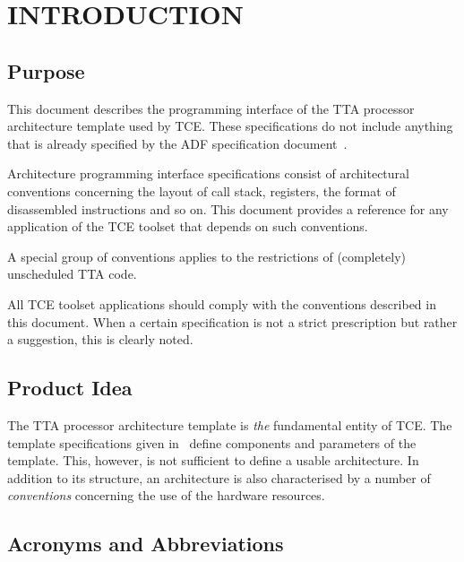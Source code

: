\documentclass[twoside]{tce}
\begin{document}
\tableofcontents

\chapter{INTRODUCTION}

\section{Purpose}

This document describes the programming interface of the TTA processor
architecture template used by TCE.  These specifications do not include
anything that is already specified by the ADF specification
document~\cite{ADF-specs}.

Architecture programming interface specifications consist of architectural
conventions concerning the layout of call stack, registers, the format of
disassembled instructions and so on.  This document provides a reference for
any application of the TCE toolset that depends on such conventions.

A special group of conventions applies to the restrictions of (completely)
unscheduled TTA code.

All TCE toolset applications should comply with the conventions described in
this document.  When a certain specification is not a strict prescription
but rather a suggestion, this is clearly noted.

\section{Product Idea}

The TTA processor architecture template is \emph{the} fundamental entity of
TCE.  The template specifications given in~\cite{ADF-specs} define
components and parameters of the template.  This, however, is not sufficient
to define a usable architecture.  In addition to its structure, an
architecture is also characterised by a number of \emph{conventions}
concerning the use of the hardware resources.

\section{Acronyms and Abbreviations}
\end{document}
